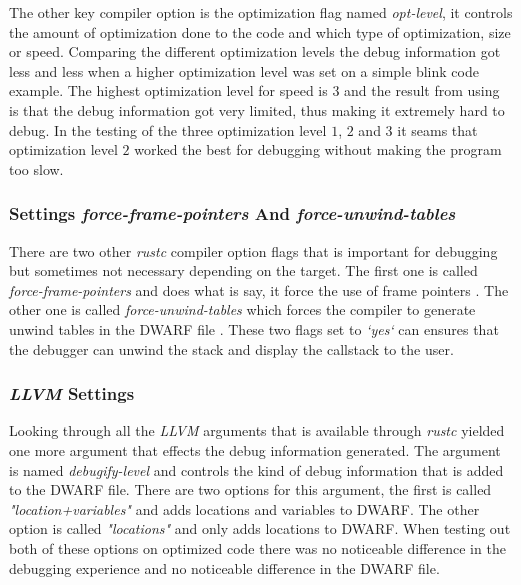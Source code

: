 The other key compiler option is the optimization flag named \emph{opt-level}, it controls the amount of optimization done to the code and which type of optimization, size or speed.
Comparing the different optimization levels the debug information got less and less when a higher optimization level was set on a simple blink code example.
The highest optimization level for speed is $3$ and the result from using is that the debug information got very limited, thus making it extremely hard to debug.
In the testing of the three optimization level $1$, $2$ and $3$ it seams that optimization level $2$ worked the best for debugging without making the program too slow.


\subsubsection{Settings \emph{force-frame-pointers} And \emph{force-unwind-tables}}
There are two other \emph{rustc} compiler option flags that is important for debugging but sometimes not necessary depending on the target.
The first one is called \emph{force-frame-pointers} and does what is say, it force the use of frame pointers \cite{rustc-book-codegen}.
The other one is called \emph{force-unwind-tables} which forces the compiler to generate unwind tables in the \gls{DWARF} file \cite{rustc-book-codegen}.
These two flags set to \emph{`yes`} can ensures that the debugger can unwind the stack and display the callstack to the user.


\subsubsection{\emph{LLVM} Settings}
Looking through all the \emph{LLVM} arguments that is available through \emph{rustc} yielded one more argument that effects the debug information generated.
The argument is named \emph{debugify-level} and controls the kind of debug information that is added to the \gls{DWARF} file.
There are two options for this argument, the first is called \emph{"location+variables"} and adds locations and variables to \gls{DWARF}.
The other option is called \emph{"locations"} and only adds locations to \gls{DWARF}.
When testing out both of these options on optimized code there was no noticeable difference in the debugging experience and no noticeable difference in the  \gls{DWARF} file.


